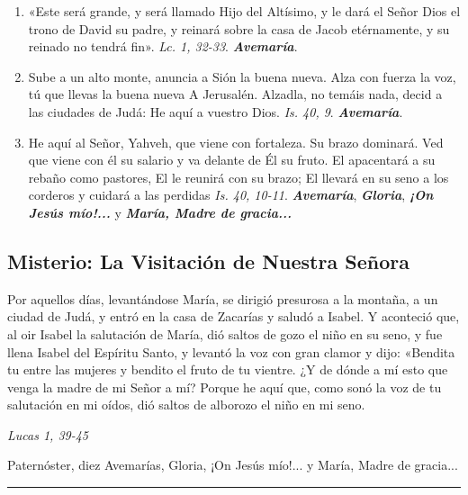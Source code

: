 \documentclass[./rosary.tex]{subfiles}
\newcounter{joyful-counter}
\begin{document}
\begin{enumerate}
      \item «Este será grande, y será llamado Hijo del Altísimo, y le dará el Señor Dios el trono de David su padre,
            y reinará sobre la casa de Jacob etérnamente, y su reinado no tendrá fin».  \emph{Lc. 1, 32-33}. \textbf{\emph{Avemaría}}.

      \item Sube a un alto monte, anuncia a Sión la buena nueva. Alza con fuerza la voz, tú que llevas la buena nueva A Jerusalén. Alzadla, no temáis nada, decid a las ciudades de Judá:
            He aquí a vuestro Dios. \emph{Is. 40, 9}. \textbf{\emph{Avemaría}}.

      \item He aquí al Señor, Yahveh, que viene con fortaleza. Su brazo dominará. Ved que viene con él su salario y va delante de Él su fruto. El apacentará a su rebaño como pastores,
            El le reunirá con su brazo; El llevará en su seno a los corderos y cuidará a las perdidas \emph{Is. 40, 10-11}.
            \textbf{\emph{Avemaría}}, \textbf{\emph{Gloria}}, \textbf{\emph{¡On Jesús mío!...}} y \textbf{\emph{María, Madre de gracia...}}
\end{enumerate}

\bigskip

\subsection*{ Misterio: La Visitación de Nuestra Señora}

Por aquellos días, levantándose María, se dirigió presurosa a la montaña, a un ciudad de Judá, y entró en la casa de Zacarías y saludó a Isabel.
Y aconteció que, al oir Isabel la salutación de María, dió saltos de gozo el niño en su seno, y fue llena Isabel del Espíritu Santo,
y levantó la voz con gran clamor y dijo: «Bendita tu entre las mujeres y bendito el fruto de tu vientre. ¿Y de dónde a mí esto que venga la madre de mi Señor a mí?
Porque he aquí que, como sonó la voz de tu salutación en mi oídos, dió saltos de alborozo el niño en mi seno.

\begin{flushright}
      \emph{Lucas 1, 39-45}
\end{flushright}

Paternóster, diez Avemarías, Gloria, ¡On Jesús mío!... y María, Madre de gracia...

\rule{\textwidth}{0.5pt}
\end{document}
